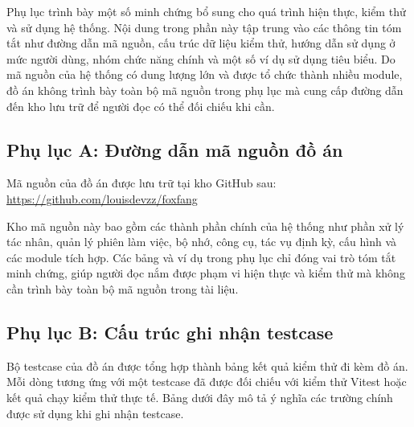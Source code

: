\documentclass[a4paper]{article}
\newcounter{chapnum}
\renewcommand{\thetable}{\arabic{chapnum}.\arabic{table}}
\renewcommand{\theHtable}{\arabic{chapnum}.\arabic{table}}
\begin{document}
Phụ lục trình bày một số minh chứng bổ sung cho quá trình hiện thực, kiểm thử và sử dụng hệ thống. Nội dung trong phần này tập trung vào các thông tin tóm tắt như đường dẫn mã nguồn, cấu trúc dữ liệu kiểm thử, hướng dẫn sử dụng ở mức người dùng, nhóm chức năng chính và một số ví dụ sử dụng tiêu biểu. Do mã nguồn của hệ thống có dung lượng lớn và được tổ chức thành nhiều module, đồ án không trình bày toàn bộ mã nguồn trong phụ lục mà cung cấp đường dẫn đến kho lưu trữ để người đọc có thể đối chiếu khi cần.

\renewcommand{\thetable}{PL.\arabic{table}}
\renewcommand{\theHtable}{PL.\arabic{table}}
\setcounter{table}{0}

\subsection*{Phụ lục A: Đường dẫn mã nguồn đồ án}

Mã nguồn của đồ án được lưu trữ tại kho GitHub sau: \url{https://github.com/louisdevzz/foxfang}

Kho mã nguồn này bao gồm các thành phần chính của hệ thống như phần xử lý tác nhân, quản lý phiên làm việc, bộ nhớ, công cụ, tác vụ định kỳ, cấu hình và các module tích hợp. Các bảng và ví dụ trong phụ lục chỉ đóng vai trò tóm tắt minh chứng, giúp người đọc nắm được phạm vi hiện thực và kiểm thử mà không cần trình bày toàn bộ mã nguồn trong tài liệu.

\subsection*{Phụ lục B: Cấu trúc ghi nhận testcase}

Bộ testcase của đồ án được tổng hợp thành bảng kết quả kiểm thử đi kèm đồ án. Mỗi dòng tương ứng với một testcase đã được đối chiếu với kiểm thử Vitest hoặc kết quả chạy kiểm thử thực tế. Bảng dưới đây mô tả ý nghĩa các trường chính được sử dụng khi ghi nhận testcase.
\end{document}
